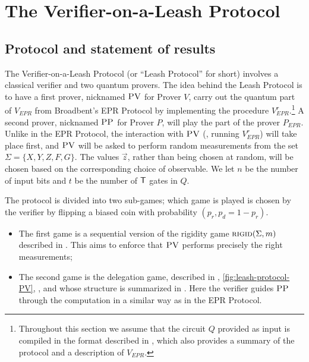 \documentclass{toc}
\newcommand{\rigid}{\textsc{rigid}}
\newcommand{\pv}{\textsc{PV}}
\newcommand{\pp}{\textsc{PP}}
\begin{document}
 

\section{The Verifier-on-a-Leash Protocol}
\label{sec:leash}





\subsection{Protocol and statement of results}
\label{sec:leash subsec}

The Verifier-on-a-Leash Protocol (or ``Leash Protocol'' for short) involves a classical verifier and two quantum provers.
The idea behind the Leash Protocol is to have a first prover, nicknamed $\pv$ for Prover $V$, carry out the quantum part of $V_{EPR}$ from Broadbent's EPR Protocol by implementing the procedure $V_{EPR}^r$.\footnote{Throughout this section we assume that the circuit $Q$ provided as input is compiled in the format described in , which also provides a summary of the protocol and a description of $V_{EPR}$.} A second prover, nicknamed $\pp$ for Prover $P$, will play the part of the prover $P_{EPR}$. Unlike in the EPR Protocol, the interaction with $\pv$ (\ie, running $V_{EPR}^r$) will take place {first}, and $\pv$ will be asked to perform {random} measurements from the set $\Sigma = \{X,Y,Z,F,G\}$. The values $\vec{z}$, rather than being chosen at random, will be chosen based on the corresponding choice of observable. We let $n$ be the number of input bits and $t$ be the number of $\sf T$ gates in $Q$. 

The protocol is divided into two sub-games; which game is played is chosen by the verifier by flipping a biased coin with probability $(p_r,p_d=1-p_r)$.
\begin{itemize}[nolistsep]
\item The first game is a sequential version of the rigidity game $\rigid(\Sigma,m)$ described in . This aims to enforce that $\pv$ performs precisely the right measurements;

\item The second game is the delegation game, described in , \ref{fig:leash-protocol-PV}, , and whose structure is summarized in . Here the verifier guides $\pp$ through the computation in a similar way as in the EPR Protocol.
\end{itemize}
\end{document}
